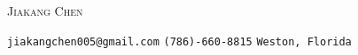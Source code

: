 \documentclass[12pt]{article}
\begin{document}
    \begin{titlepage}
    \end{titlepage}

	\begin{center}
		\textsc{\Huge{Jiakang Chen}}
	\end{center}

	\normalsize

	\begin{center}
		\texttt{jiakangchen005@gmail.com} \hspace{1in} \texttt{(786)-660-8815} \hspace{1.5in} \texttt{Weston, Florida}
	\end{center}
	
	
\end{document}

